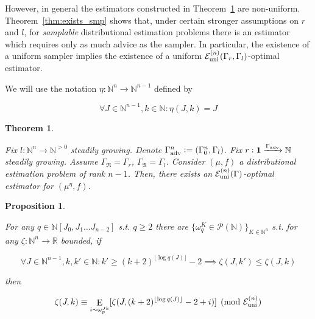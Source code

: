 \documentclass{article}
\numberwithin{equation}{section}
\theoremstyle{definition}
\theoremstyle{plain}
\newtheorem{theorem}{Theorem}[section]
\newtheorem{proposition}{Proposition}[section]
\DeclareMathOperator{\E}{E}
\newcommand{\Nats}{\mathbb{N}}
\newcommand{\Reals}{\mathbb{R}}
\newcommand{\NatPolyJ}{\Nats[J_0, J_1 \ldots J_{n-2}]}
\newcommand{\NatFun}{\Nats^n \rightarrow}
\newcommand{\Floor}[1]{\lfloor #1 \rfloor}
\newcommand{\GrowR}{\Gamma_{\mathfrak{R}}}
\newcommand{\GrowA}{\Gamma_{\mathfrak{A}}}
\newcommand{\Fall}{\mathcal{E}}
\newcommand{\FallU}{{\Fall_{\textnormal{uni}}^{(n)}}}
\begin{document}
However, in general the estimators constructed in Theorem~\ref{thm:exists_all} are non-uniform. Theorem~\ref{thm:exists_smp} shows that, under certain stronger assumptions on ${r}$ and ${l}$, for \emph{samplable} distributional estimation problems there is an estimator which requires only as much advice as the sampler. In particular, the existence of a uniform sampler implies the existence of a uniform ${\FallU(\Gamma_r,\Gamma_l)}$-optimal estimator.

We will use the notation ${\eta: \NatFun \Nats^{n-1}}$ defined by

\[\forall J \in \Nats^{n-1}, k \in \Nats: \eta(J,k)=J\]

\begin{samepage}
\begin{theorem}
\label{thm:exists_all}

Fix ${l: \NatFun \Nats^{>0}}$ steadily growing. Denote ${\Gamma_{\textnormal{adv}}^n:=(\Gamma_0^n,\Gamma_l)}$. Fix ${r: \bm{1} \xrightarrow{\Gamma_{\textnormal{adv}}}\Nats}$ steadily growing. Assume ${\GrowR=\Gamma_r}$, ${\GrowA=\Gamma_l}$. Consider ${(\mu,f)}$ a distributional estimation problem of rank ${n-1}$. Then, there exists an ${\FallU(\Gamma)}$-optimal estimator for ${(\mu^\eta,f)}$.

\end{theorem}
\end{samepage}

\begin{samepage}
\begin{proposition}
\label{prp:fall_uni_weak}

For any ${q \in \NatPolyJ}$ s.t. ${q \geq 2}$ there are ${\{\omega_q^K \in \mathcal{P}(\Nats)\}_{K \in \Nats^n}}$ s.t. for any ${\zeta: \NatFun \Reals}$ bounded, if 

\begin{equation}
\label{eqn:prp__fall_uni_weak__prem}
\forall J \in \Nats^{n-1}, k,k' \in \Nats: k' \geq (k+2)^{\Floor{\log q(J)}}-2 \implies \zeta(J,k') \leq \zeta(J,k)
\end{equation}

then

\begin{equation}
\label{eqn:prp__fall_uni_weak__conc}
\zeta(J,k) \equiv \E_{i \sim \omega_p^{Jk}}[\zeta(J,(k+2)^{\Floor{\log q(J)}}-2+i)] \pmod \FallU
\end{equation}

\end{proposition}
\end{samepage}
\end{document}
